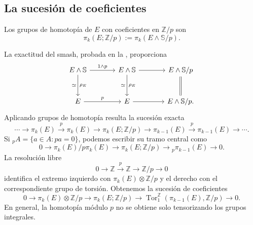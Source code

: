 \subsection{La sucesión de coeficientes}
\begin{defi}
Los grupos de homotopía de $E$ con coeficientes en $\mathbb Z/p$ son
\[
\pi_k(E;\mathbb Z/p):=\pi_k(E\wedge\mathbb S/p).
\]
\end{defi}
La exactitud del smash, probada en la , proporciona
\[
\begin{tikzcd}[column sep=large,row sep=large]
E\wedge\mathbb S\arrow[r,"1\wedge p"]\arrow[d,"\rho_E","\simeq"']
&E\wedge\mathbb S\arrow[r]\arrow[d,"\rho_E","\simeq"']&E\wedge\mathbb S/p\arrow[d,equal]\\
E\arrow[r,"p"]&E\arrow[r]&E\wedge\mathbb S/p.
\end{tikzcd}
\]
Aplicando grupos de homotopía resulta la sucesión exacta
\[
\cdots\longrightarrow\pi_k(E)\xrightarrow{p}\pi_k(E)
\longrightarrow\pi_k(E;\mathbb Z/p)
\longrightarrow\pi_{k-1}(E)\xrightarrow{p}\pi_{k-1}(E)\longrightarrow\cdots.
\]
Si ${}_pA=\{a\in A:pa=0\}$, podemos escribir su tramo central como
\[
0\longrightarrow\pi_k(E)/p\pi_k(E)
\longrightarrow\pi_k(E;\mathbb Z/p)
\longrightarrow{}_p\pi_{k-1}(E)\longrightarrow0.
\]
La resolución libre
\[
0\longrightarrow\mathbb Z\xrightarrow{p}\mathbb Z\longrightarrow\mathbb Z/p\longrightarrow0
\]
identifica el extremo izquierdo con $\pi_k(E)\otimes\mathbb Z/p$ y el derecho con el correspondiente grupo de torsión. Obtenemos la sucesión de coeficientes
\[
0\longrightarrow\pi_k(E)\otimes\mathbb Z/p
\longrightarrow\pi_k(E;\mathbb Z/p)
\longrightarrow\operatorname{Tor}^{\mathbb Z}_1(\pi_{k-1}(E),\mathbb Z/p)
\longrightarrow0.
\]
En general, la homotopía módulo $p$ no se obtiene solo tensorizando los grupos integrales.

